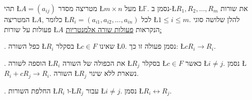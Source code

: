\begin{hdef}
תהי \L{$A=(a_{ij})$} מטריצה מסדר \L{$m\times n$} מעל \L{$\mathbb{F}$}.
נסמן ב-\L{$R_{1},R_{2},...,R_{m}$} את שורות המטריצה \L{$A$}, כלומר
\L{$R_{i}=(a_{i1},a_{i2},...,a_{in})$} לכל \L{$1\leq i\leq m$}.
להלן שלושה סוגי פעולות על שורות \L{$A$} הנקראות \uline{פעולות שורה
אלמנטריות:}

{\endL}. כפל השורה \L{$R_{i}$} בסקלר \L{$c\in F$} שאינו
\L{$0$}. נסמן פעולה זו כך: \L{$cR_{i}\rightarrow R_{i}$}.

{\endL}. הוספה לשורה \L{$R_{i}$} את הכפולה של השורה \L{$R_{j}$}
בסקלר \L{$c\in F$} כאשר \L{$i\neq j$}. נסמן \L{$R_{i}+cR_{j}\rightarrow R_{i}$}.
השורה \L{$R_{j}$} נשארת ללא שינוי.

{\endL}. החלפת השורות \L{$R_{i}$} ו-\L{$R_{j}$} עבור \L{$i\neq j$}.
נסמן \L{$R_{i}\leftrightarrow R_{j}$}.
\end{hdef}

